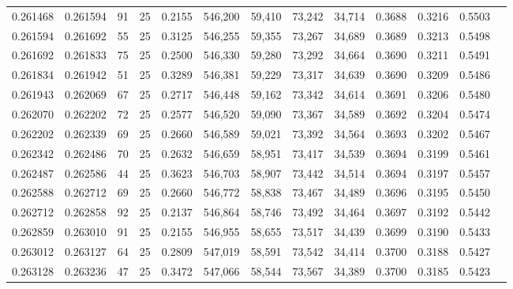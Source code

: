 \begin{tabular}{rrrrrrrrrrrrr}
0.261468 & 0.261594 &    91 &  25 &                                     0.2155 & 546,200 &  59,410 &  73,242 &  34,714 & 0.3688 & 0.3216 & 0.5503 \\
0.261594 & 0.261692 &    55 &  25 &                                     0.3125 & 546,255 &  59,355 &  73,267 &  34,689 & 0.3689 & 0.3213 & 0.5498 \\
0.261692 & 0.261833 &    75 &  25 &                                     0.2500 & 546,330 &  59,280 &  73,292 &  34,664 & 0.3690 & 0.3211 & 0.5491 \\
0.261834 & 0.261942 &    51 &  25 &                                     0.3289 & 546,381 &  59,229 &  73,317 &  34,639 & 0.3690 & 0.3209 & 0.5486 \\
0.261943 & 0.262069 &    67 &  25 &                                     0.2717 & 546,448 &  59,162 &  73,342 &  34,614 & 0.3691 & 0.3206 & 0.5480 \\
0.262070 & 0.262202 &    72 &  25 &                                     0.2577 & 546,520 &  59,090 &  73,367 &  34,589 & 0.3692 & 0.3204 & 0.5474 \\
0.262202 & 0.262339 &    69 &  25 &                                     0.2660 & 546,589 &  59,021 &  73,392 &  34,564 & 0.3693 & 0.3202 & 0.5467 \\
0.262342 & 0.262486 &    70 &  25 &                                     0.2632 & 546,659 &  58,951 &  73,417 &  34,539 & 0.3694 & 0.3199 & 0.5461 \\
0.262487 & 0.262586 &    44 &  25 &                                     0.3623 & 546,703 &  58,907 &  73,442 &  34,514 & 0.3694 & 0.3197 & 0.5457 \\
0.262588 & 0.262712 &    69 &  25 &                                     0.2660 & 546,772 &  58,838 &  73,467 &  34,489 & 0.3696 & 0.3195 & 0.5450 \\
0.262712 & 0.262858 &    92 &  25 &                                     0.2137 & 546,864 &  58,746 &  73,492 &  34,464 & 0.3697 & 0.3192 & 0.5442 \\
0.262859 & 0.263010 &    91 &  25 &                                     0.2155 & 546,955 &  58,655 &  73,517 &  34,439 & 0.3699 & 0.3190 & 0.5433 \\
0.263012 & 0.263127 &    64 &  25 &                                     0.2809 & 547,019 &  58,591 &  73,542 &  34,414 & 0.3700 & 0.3188 & 0.5427 \\
0.263128 & 0.263236 &    47 &  25 &                                     0.3472 & 547,066 &  58,544 &  73,567 &  34,389 & 0.3700 & 0.3185 & 0.5423 \\

\end{tabular}
